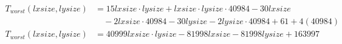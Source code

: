 \begin{subequations}
\label{eq:analyse-arlabeling-regionlabeling-3}
\begin{align}
\label{eq:analyse-arlabeling-regionlabeling-3-1}
T_{worst}(\mathit{lxsize},\mathit{lysize})& =
 15\mathit{lxsize}\cdot\mathit{lysize} + \mathit{lxsize}\cdot\mathit{lysize}\cdot 40984 - 30\mathit{lxsize} \\
 & \quad - 2\mathit{lxsize}\cdot 40984 -30\mathit{lysize} - 2\mathit{lysize}\cdot 40984 + 61 + 4(40984) \nonumber \\
\label{eq:analyse-arlabeling-regionlabeling-3-2}
T_{worst}(\mathit{lxsize},\mathit{lysize})& =
 40999\mathit{lxsize}\cdot\mathit{lysize} -81998\mathit{lxsize} -81998\mathit{lysize} + 163997
\end{align}
\end{subequations}
